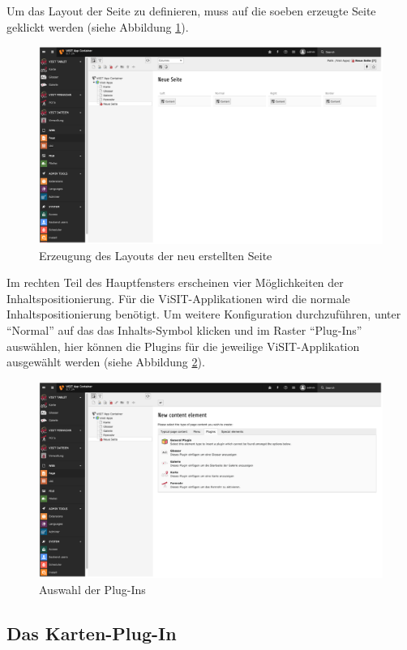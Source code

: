 Um das Layout der Seite zu definieren, muss auf die soeben erzeugte Seite geklickt werden (siehe Abbildung \ref{img:layout_erzeugung}).

\begin{figure}[ht!]
\centering
\includegraphics[width=12cm]{Figures/paula/layout_erzeugung.png}
\caption{Erzeugung des Layouts der neu erstellten Seite}
\label{img:layout_erzeugung}
\end{figure}

Im rechten Teil des Hauptfensters erscheinen vier Möglichkeiten der Inhaltspositionierung. Für die ViSIT-Applikationen wird die normale Inhaltspositionierung benötigt.  Um weitere Konfiguration durchzuführen, unter “Normal” auf das das Inhalts-Symbol klicken und im Raster “Plug-Ins” auswählen, hier können die Plugins für die jeweilige ViSIT-Applikation ausgewählt werden (siehe Abbildung \ref{img:auswahl_plugins}).

\begin{figure}[ht!]
\centering
\includegraphics[width=12cm]{Figures/paula/auswahl_plugins.png}
\caption{Auswahl der Plug-Ins}
\label{img:auswahl_plugins}
\end{figure}

\subsection{Das Karten-Plug-In}

